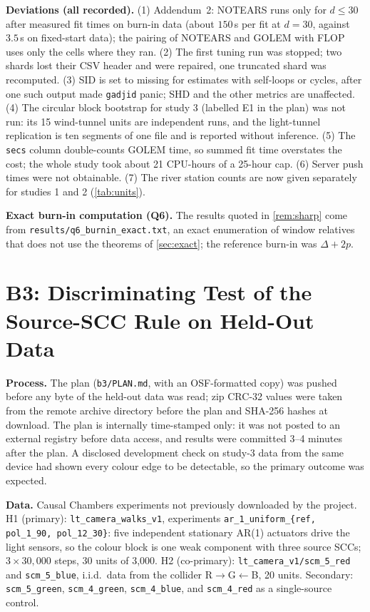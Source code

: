 \textbf{Deviations (all recorded).} (1) Addendum~2: NOTEARS runs only for
$d\le30$ after measured fit times on burn-in data (about $150$\,s per fit at
$d=30$, against $3.5$\,s on fixed-start data); the pairing of NOTEARS and GOLEM
with FLOP uses only the cells where they ran. (2) The first tuning run was
stopped; two shards lost their CSV header and were repaired, one truncated
shard was recomputed. (3) SID is set to missing for estimates with self-loops or
cycles, after one such output made \texttt{gadjid} panic; SHD and the other
metrics are unaffected. (4) The circular block bootstrap for study 3 (labelled E1 in the plan) was not run:
its 15 wind-tunnel units are independent runs, and the light-tunnel replication
is ten segments of one file and is reported without inference. (5) The
\texttt{secs} column double-counts GOLEM time, so summed fit time overstates
the cost; the whole study took about 21 CPU-hours of a 25-hour cap. (6) Server
push times were not obtainable. (7) The river station counts are now given separately for studies 1 and 2
(\cref{tab:units}).

\textbf{Exact burn-in computation (Q6).} The results quoted in \cref{rem:sharp}
come from \texttt{results/q6\_burnin\_exact.txt}, an exact enumeration of window
relatives that does not use the theorems of \cref{sec:exact}; the reference
burn-in was $\Delta+2p$.

\section{B3: Discriminating Test of the Source-SCC Rule on Held-Out Data}
\label{app:b3}

\textbf{Process.} The plan (\texttt{b3/PLAN.md}, with an OSF-formatted copy) was
pushed before any byte of the held-out data was read; zip CRC-32 values were
taken from the remote archive directory before the plan and SHA-256 hashes at
download. The plan is internally time-stamped only: it was not posted to an
external registry before data access, and results were committed 3--4 minutes
after the plan. A disclosed development check on study-3 data from the same
device had shown every colour edge to be detectable, so the primary outcome
was expected.

\textbf{Data.} Causal Chambers experiments not previously downloaded by the
project. H1 (primary): \texttt{lt\_camera\_walks\_v1}, experiments
\texttt{ar\_1\_uniform\_\{ref, pol\_1\_90, pol\_12\_30\}}: five independent
stationary AR(1) actuators drive the light sensors, so the colour block is
one weak component with three source SCCs; $3\times30{,}000$ steps, 30 units of
3{,}000. H2 (co-primary): \texttt{lt\_camera\_v1/scm\_5\_red} and
\texttt{scm\_5\_blue}, i.i.d.\ data from the collider R$\to$G$\leftarrow$B, 20
units. Secondary: \texttt{scm\_5\_green}, \texttt{scm\_4\_green},
\texttt{scm\_4\_blue}, and \texttt{scm\_4\_red} as a single-source control.

